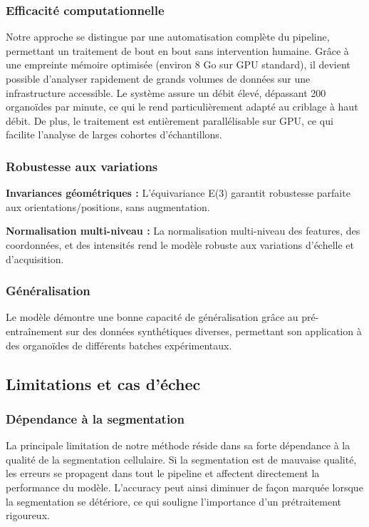 \subsubsection{Efficacité computationnelle}

Notre approche se distingue par une automatisation complète du pipeline, permettant un traitement de bout en bout sans intervention humaine. Grâce à une empreinte mémoire optimisée (environ 8 Go sur GPU standard), il devient possible d'analyser rapidement de grands volumes de données sur une infrastructure accessible. Le système assure un débit élevé, dépassant 200 organoïdes par minute, ce qui le rend particulièrement adapté au criblage à haut débit. De plus, le traitement est entièrement parallélisable sur GPU, ce qui facilite l'analyse de larges cohortes d'échantillons.

\subsubsection{Robustesse aux variations}

\textbf{Invariances géométriques :}
L'équivariance E(3) garantit robustesse parfaite aux orientations/positions, sans augmentation.

\textbf{Normalisation multi-niveau :}
La normalisation multi-niveau des features, des coordonnées, et des intensités rend le modèle robuste aux variations d'échelle et d'acquisition.

\subsubsection{Généralisation}

Le modèle démontre une bonne capacité de généralisation grâce au pré-entraînement sur des données synthétiques diverses, permettant son application à des organoïdes de différents batches expérimentaux.

\subsection{Limitations et cas d'échec}

\subsubsection{Dépendance à la segmentation}

La principale limitation de notre méthode réside dans sa forte dépendance à la qualité de la segmentation cellulaire. Si la segmentation est de mauvaise qualité, les erreurs se propagent dans tout le pipeline et affectent directement la performance du modèle. L'accuracy peut ainsi diminuer de façon marquée lorsque la segmentation se détériore, ce qui souligne l'importance d'un prétraitement rigoureux.


